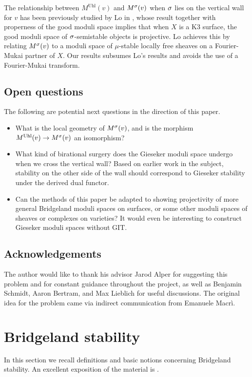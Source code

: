 The relationship between $M^{\mathrm{Uhl}}(v)$ and $M^\sigma(v)$ when $\sigma$ lies on the vertical wall for $v$ has been previously studied by Lo in \cite{lo}, whose result together with properness of the good moduli space implies that when $X$ is a K3 surface, the good moduli space of $\sigma$-semistable objects is projective. Lo achieves this by relating $M^\sigma(v)$ to a moduli space of $\mu$-stable locally free sheaves on a Fourier-Mukai partner of $X$. Our results subsumes Lo's results and avoids the use of a Fourier-Mukai transform.

\subsection*{Open questions}
The following are potential next questions in the direction of this paper.
\begin{itemize}
    \item What is the local geometry of $M^\sigma(v)$, and is the morphism $M^{\mathrm{Uhl}}(v) \to M^\sigma(v)$ an isomorphism?
    \item What kind of birational surgery does the Gieseker moduli space undergo when we cross the vertical wall? Based on earlier work in the subject, stability on the other side of the wall should correspond to Gieseker stability under the derived dual functor.
    \item Can the methods of this paper be adapted to showing projectivity of more general Bridgeland moduli spaces on surfaces, or some other moduli spaces of sheaves or complexes on varieties? It would even be interesting to construct Gieseker moduli spaces without GIT. 
\end{itemize}

\subsection*{Acknowledgements}

The author would like to thank his advisor Jarod Alper for suggesting this problem and for constant guidance throughout the project, as well as Benjamin Schmidt, Aaron Bertram, and Max Lieblich for useful discussions. The original idea for the problem came via indirect communication from Emanuele Macr\`i. 




\section{Bridgeland stability}
In this section we recall definitions and basic notions concerning Bridgeland stability. An excellent exposition of the material is \cite{MS}. 

